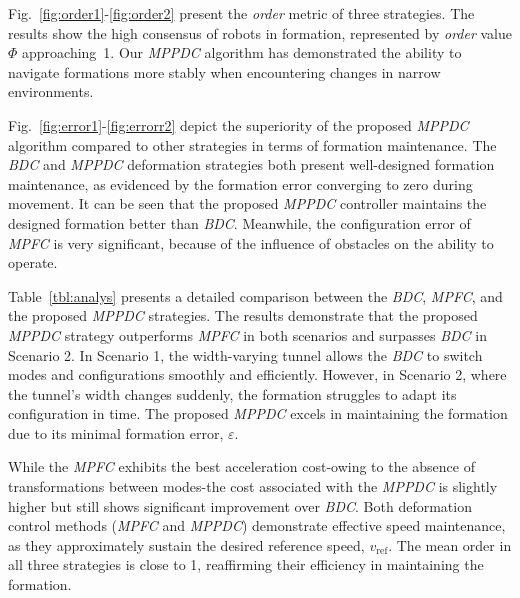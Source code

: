 Fig.~\ref{fig:order1}-\ref{fig:order2} present the \textit{order} metric of three strategies. The results show the high consensus of robots in formation, represented by \textit{order} value $\Phi$ approaching~1. Our \textit{MPPDC} algorithm has demonstrated the ability to navigate formations more stably when encountering changes in narrow environments.

Fig.~\ref{fig:error1}-\ref{fig:errorr2} depict the superiority of the proposed \textit{MPPDC} algorithm compared to other strategies in terms of formation maintenance. The \textit{BDC} and \textit{MPPDC} deformation strategies both present well-designed formation maintenance, as evidenced by the formation error converging to zero during movement. It can be seen that the proposed \textit{MPPDC} controller maintains the designed formation better than \textit{BDC}. Meanwhile, the configuration error of \textit{MPFC} is very significant, because of the influence of obstacles on the ability to operate.

Table~\ref{tbl:analys} presents a detailed comparison between the \textit{BDC}, \textit{MPFC}, and the proposed \textit{MPPDC} strategies. The results demonstrate that the proposed \textit{MPPDC} strategy outperforms \textit{MPFC} in both scenarios and surpasses \textit{BDC} in Scenario 2. In Scenario 1, the width-varying tunnel allows the \textit{BDC} to switch modes and configurations smoothly and efficiently. However, in Scenario 2, where the tunnel's width changes suddenly, the formation struggles to adapt its configuration in time. The proposed \textit{MPPDC} excels in maintaining the formation due to its minimal formation error, $\varepsilon$.

While the \textit{MPFC} exhibits the best acceleration cost-owing to the absence of transformations between modes-the cost associated with the \textit{MPPDC} is slightly higher but still shows significant improvement over \textit{BDC}. Both deformation control methods (\textit{MPFC} and \textit{MPPDC}) demonstrate effective speed maintenance, as they approximately sustain the desired reference speed, $v_\text{ref}$. The mean order in all three strategies is close to 1, reaffirming their efficiency in maintaining the formation.

